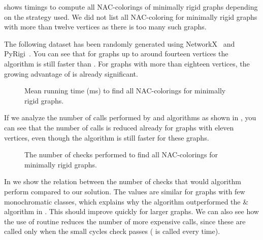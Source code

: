 shows timings to compute all NAC-colorings of minimally rigid graphs
depending on the strategy used.
We did not list all NAC-coloring for minimally rigid graphs with more than twelve vertices
as there is too many such graphs.

The following dataset has been randomly generated
using NetworkX~\cite{networkx} and PyRigi~\cite{pyrigi}.
%
You can see that for graphs up to around fourteen vertices the \NaiveCycles{} algorithm
is still faster than \Subgraphs{}.
For graphs with more than eighteen vertices,
the growing advantage of \Subgraphs{} is already significant.

\begin{figure}[ht]
	\centering
	\scalebox{0.5}{}
	\caption[Running time for minimally rigid graphs.]{
		Mean running time (ms) to find all NAC-colorings for minimally rigid graphs.}%
	\label{fig:graph_time_minimally_rigid}
\end{figure}

If we analyze the number of \IsNACColoring{} calls performed by \NaiveCycles{} and \Subgraphs{} algorithms
as shown in ,
you can see that the number of \IsNACColoring{} calls is reduced already for graphs
with eleven vertices,
even though the \NaiveCycles{} algorithm is still faster for these graphs.

\begin{figure}[ht]
	\centering
	\scalebox{0.5}{}
	\caption[Checks performed or minimally rigid graphs.]{
		The number of checks performed to find all NAC-colorings for minimally rigid graphs.}%
	\label{fig:graph_count_minimally_rigid}
\end{figure}

In 
we show the relation between the number of \IsNACColoring{} checks that
would \Naive{} algorithm perform compared to our solution.
The values are similar for graphs with few monochromatic classes,
which explains why the \NaiveCycles{} algorithm outperformed
the \NeighborsDegree{}\&\MergeLinear{} algorithm in . This should improve quickly for larger graphs.
We can also see how the use of \CycleMask{} routine
reduces the number of more expensive \IsNACColoring{} calls,
since these are called only when the small cycles check \CycleMask{} passes
(\CycleMask{} is called every time).

